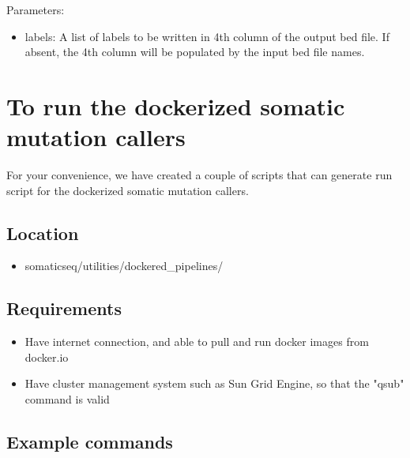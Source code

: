 \documentclass[10pt,letterpaper]{article}
\begin{document}
\begin{sloppypar}
Parameters:

\begin{itemize}

\item labels: A list of labels to be written in 4th column of the output bed file. If absent, the 4th column will be populated by the input bed file names.

\end{itemize}


















\section{To run the dockerized somatic mutation callers} \label{dockerized_callers}

For your convenience, we have created a couple of scripts that can generate run script for the dockerized somatic mutation callers. 

\subsection{Location}

  \begin{itemize}
    \item somaticseq/utilities/dockered\_pipelines/
  \end{itemize}

\subsection{Requirements}

  \begin{itemize}
    \item Have internet connection, and able to pull and run docker images from docker.io
    \item Have cluster management system such as Sun Grid Engine, so that the "qsub" command is valid
  \end{itemize}


\subsection{Example commands}


\end{sloppypar}
\end{document}
